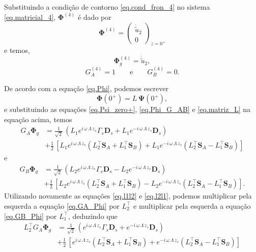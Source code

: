 Substituindo a condi\c{c}\~ao de contorno \ref{eq.cond_fron_4} no sistema \ref{eq.matricial_4}, $\mathbf{\Phi}^{(4)}$ \'e dado por
\begin{equation*}
\mathbf{\Phi}^{(4)}=
\begin{pmatrix}
\dot{\tilde{u}}_2\\
0
\end{pmatrix}_{z=0^+}
\end{equation*}
e temos,
\begin{equation*}
\mathbf{\Phi}_g^{(4)}=\dot{\tilde{u}}_2,
\end{equation*}
\begin{equation*}
G_A^{(4)}=1\qquad\text{e}\qquad G_B^{(4)}=0.
\end{equation*}

De acordo com a equa\c{c}\~ao \ref{eq.Phi}, podemos escrever
\begin{equation*}
\mathbf{\Phi}(0^+)=L\,\mathbf{\Psi}(0^+),
\end{equation*}
e substituindo as equa\c{c}\~oes \ref{eq.Psi_zero+}, \ref{eq.Phi_G_AB} e \ref{eq.matriz_L} na equa\c{c}\~ao acima, temos
\begin{align}\label{eq.GA_Phi}
G_A\mathbf{\Phi}_g&=\frac{1}{\sqrt{2}}\,(L_1e^{i\,\omega\,\Lambda\,z_s}\Gamma_s\mathbf{D}_s+L_1e^{-i\,\omega\,\Lambda\,z_s}\mathbf{D}_s)\\\nonumber
&+\frac{1}{2}\,\left[L_1e^{i\,\omega\,\Lambda\,z_s}(L_2^\top\mathbf{S}_A+L_1^\top\mathbf{S}_B)+L_1e^{-i\,\omega\,\Lambda\,z_s}(L_2^\top\mathbf{S}_A-L_1^\top\mathbf{S}_B)\right]
\end{align}
e
\begin{align}\label{eq.GB_Phi}
G_B\mathbf{\Phi}_g&=\frac{1}{\sqrt{2}}\,(L_2e^{i\,\omega\,\Lambda\,z_s}\Gamma_s\mathbf{D}_s-L_2e^{-i\,\omega\,\Lambda\,z_s}\mathbf{D}_s)\\\nonumber
&+\frac{1}{2}\,\left[L_2e^{i\,\omega\,\Lambda\,z_s}(L_2^\top\mathbf{S}_A+L_1^\top\mathbf{S}_B)-L_2e^{-i\,\omega\,\Lambda\,z_s}(L_2^\top\mathbf{S}_A-L_1^\top\mathbf{S}_B)\right].
\end{align}
Utilizando novamente as equa\c{c}\~oes \ref{eq.l1l2} e \ref{eq.l2l1}, podemos multiplicar pela esquerda a equa\c{c}\~ao \ref{eq.GA_Phi} por $L_2^\top$ e multiplicar pela esquerda a equa\c{c}\~ao \ref{eq.GB_Phi} por $L_1^\top$, deduzindo que
\begin{align}\label{eq.LGA_Phi}
L_2^{\top}G_A\mathbf{\Phi}_g&=\frac{1}{\sqrt{2}}\,(e^{i\,\omega\,\Lambda\,z_s}\Gamma_s\mathbf{D}_s+e^{-i\,\omega\,\Lambda\,z_s}\mathbf{D}_s)\\\nonumber
&+\frac{1}{2}\,\left[e^{i\,\omega\,\Lambda\,z_s}(L_2^\top\mathbf{S}_A+L_1^\top\mathbf{S}_B)+e^{-i\,\omega\,\Lambda\,z_s}(L_2^\top\mathbf{S}_A-L_1^\top\mathbf{S}_B)\right]
\end{align}
